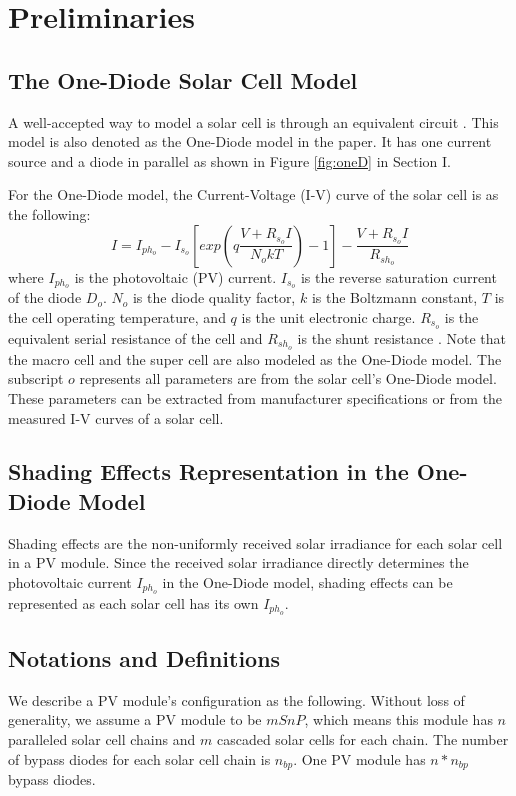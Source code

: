\section{Preliminaries}
\subsection{The One-Diode Solar Cell Model}
A well-accepted way to model a solar cell is through an equivalent circuit \cite{oneD1}. This model is also denoted as the One-Diode model in the paper. It has one current source and a diode in parallel as shown in Figure \ref{fig:oneD} in Section I.

For the One-Diode model, the Current-Voltage (I-V) curve of the solar cell is as the following:
\begin{equation}\label{equ:oneD}
  I = I_{ph_o} - I_{s_o}[exp(q\frac{V + R_{s_o}I}{N_okT}) - 1] - \frac{V + R_{s_o}I}{R_{{sh}_o}}
\end{equation}
where $I_{ph_o}$ is the photovoltaic (PV) current. $I_{s_o}$ is the reverse saturation current of the diode $D_o$. $N_o$ is the diode quality factor, $k$ is the Boltzmann constant, $T$ is the cell operating temperature, and $q$ is the unit electronic charge. $R_{s_o}$ is the equivalent serial resistance of the cell and $R_{{sh}_o}$ is the shunt resistance \cite{oneD1}. Note that the macro cell and the super cell are also modeled as the One-Diode model. The subscript $o$ represents all parameters are from the solar cell's One-Diode model. These parameters can be extracted from manufacturer specifications or from the measured I-V curves of a solar cell.
\subsection{Shading Effects Representation in the One-Diode Model}
Shading effects are the non-uniformly received solar irradiance for each solar cell in a PV module. Since the received solar irradiance directly determines the photovoltaic current $I_{ph_o}$ in the One-Diode model, shading effects can be represented as each solar cell has its own $I_{ph_o}$.
\subsection{Notations and Definitions}
We describe a PV module's configuration as the following. Without loss of generality, we assume a PV module to be $mSnP$, which means this module has $n$ paralleled solar cell chains and $m$ cascaded solar cells for each chain. The number of bypass diodes for each solar cell chain is $n_{bp}$. One PV module has $n*n_{bp}$ bypass diodes.

